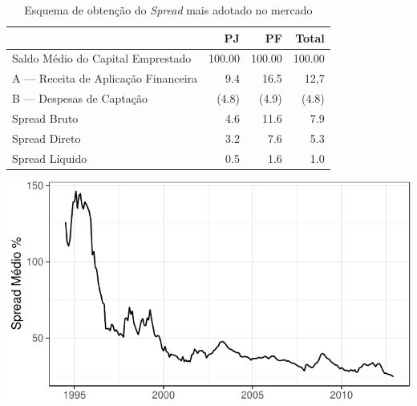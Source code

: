 \documentclass[
  12pt,
  12pt,
  openright,
  oneside,
  a4paper,
  chapter=TITLE,
  section=TITLE,
  subsection=TITLE,
  subsubsection=TITLE,
  portugues,
  sumario=tradicional]{abntex2}
\begin{document}
\begin{table}[!htbp]
\vspace{20pt}
 \centering
   \caption{Esquema de obtenção do \emph{Spread} mais adotado no mercado} 
   \vspace{1mm}
    \label{tab:spread.tb}
     \begin{tabular}{l|r|r|r}
      \hline
                                           &   PJ   &   PF    & Total \\
       \hline
       Saldo Médio do Capital Emprestado   & 100.00 & 100.00  & 100.00 \\
       A — Receita de Aplicação Financeira & 9.4    & 16.5    & 12,7   \\
       B — Despesas de Captação            & (4.8)  & (4.9)   & (4.8)  \\   
       Spread Bruto                        & 4.6    & 11.6    & 7.9    \\
       Spread Direto                       & 3.2    & 7.6     & 5.3    \\
       Spread Líquido                      & 0.5    & 1.6     & 1.0    \\
       \hline
       \end{tabular}
\vspace{1mm}
\vspace{-2mm}
\end{table}

\begin{grafico}[!hbtp]
\vspace{20pt}
\caption{Evolução do \emph{spread} bancário brasileiro até 2011}
\vspace{-4mm}

\begin{center}\includegraphics{12-exportedfigures/average spread-1} \end{center}
\vspace{-3mm}
\label{graf:spread2012}
\vspace{-2mm}
\end{grafico}
\end{document}
